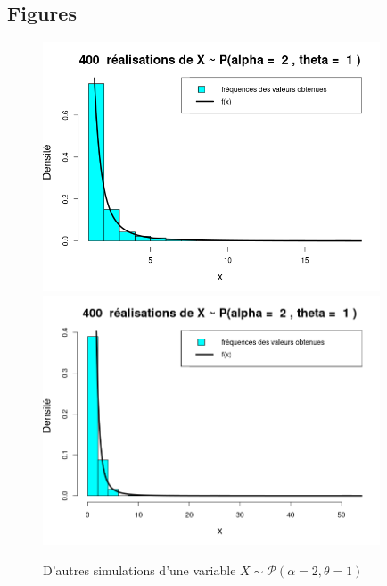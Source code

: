 \documentclass{article}
\begin{document}
\subsection{Figures}

\begin{figure}[!ht]
\begin{center}
\includegraphics[width=10cm]{plot_hist_1}
\includegraphics[width=10cm]{plot_hist_2}
\caption{D'autres simulations d'une variable $X \sim \mathcal{P}(\alpha=2,\theta=1)$}
\end{center}
\end{figure}

\clearpage
\end{document}
